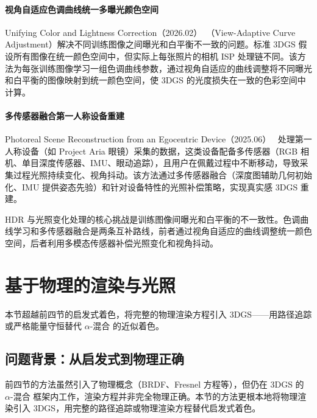 \paragraph{视角自适应色调曲线统一多曝光颜色空间}

Unifying Color and Lightness Correction（2026.02）~\cite{2602_18322}（View-Adaptive Curve Adjustment）解决不同训练图像之间曝光和白平衡不一致的问题。标准 3DGS 假设所有图像在统一颜色空间中，但实际上每张照片的相机 ISP 处理链不同。该方法为每张训练图像学习一组色调曲线参数，通过视角自适应的曲线调整将不同曝光和白平衡的图像映射到统一颜色空间，使 3DGS 的光度损失在一致的色彩空间中计算。

\paragraph{多传感器融合第一人称设备重建}

Photoreal Scene Reconstruction from an Egocentric Device（2025.06）~\cite{2506_04444} 处理第一人称设备（如 Project Aria 眼镜）采集的数据，这类设备配备多传感器（RGB 相机、单目深度传感器、IMU、眼动追踪），且用户在佩戴过程中不断移动，导致采集过程光照持续变化、视角抖动。该方法通过多传感器融合（深度图辅助几何初始化、IMU 提供姿态先验）和针对设备特性的光照补偿策略，实现真实感 3DGS 重建。

\begin{takeaway}
HDR 与光照变化处理的核心挑战是训练图像间曝光和白平衡的不一致性。色调曲线学习和多传感器融合是两条互补路线，前者通过视角自适应的曲线调整统一颜色空间，后者利用多模态传感器补偿光照变化和视角抖动。
\end{takeaway}



\section{基于物理的渲染与光照}
\label{sec:05_5}

本节超越前四节的启发式着色，将完整的物理渲染方程引入 3DGS——用路径追踪或严格能量守恒替代 $\alpha$-混合 的近似着色。

\subsection{问题背景：从启发式到物理正确}

前四节的方法虽然引入了物理概念（BRDF、Fresnel 方程等），但仍在 3DGS 的 $\alpha$-混合 框架内工作，渲染方程并非完全物理正确。本节的方法更根本地将物理渲染引入 3DGS，用完整的路径追踪或物理渲染方程替代启发式着色。

